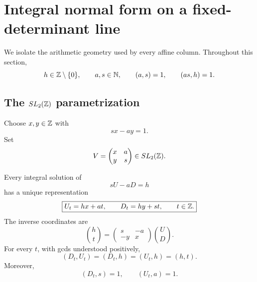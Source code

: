 \section{Integral normal form on a fixed-determinant line}
\label{sec:tpc33-affine-normal}

We isolate the arithmetic geometry used by every affine column.  Throughout
this section,
\begin{equation}
 h\in\mathbb Z\setminus\{0\},\qquad a,s\in\mathbb N,\qquad
 (a,s)=1,\qquad(as,h)=1.
 \label{eq:tpc33-affine-hypotheses}
\end{equation}

\subsection{The \texorpdfstring{\(SL_2(\mathbb Z)\)}{SL2(Z)} parametrization}

Choose \(x,y\in\mathbb Z\) with
\begin{equation}
 sx-ay=1.
 \label{eq:tpc33-bezout}
\end{equation}
Set
\begin{equation}
 V=\begin{pmatrix}x&a\\y&s\end{pmatrix}\in SL_2(\mathbb Z).
 \label{eq:tpc33-unimodular-matrix}
\end{equation}

\begin{theorem}
\label{thm:tpc33-affine-normal-form}
Every integral solution of
\begin{equation}
 sU-aD=h
 \label{eq:tpc33-fixed-determinant-equation}
\end{equation}
has a unique representation
\begin{equation}
 \boxed{
 U_t=hx+at,
 \qquad
 D_t=hy+st,
 \qquad t\in\mathbb Z.}
 \label{eq:tpc33-canonical-affine-forms}
\end{equation}
The inverse coordinates are
\begin{equation}
 \boxed{
 \binom ht
 =\begin{pmatrix}s&-a\\-y&x\end{pmatrix}
  \binom UD.}
 \label{eq:tpc33-affine-inverse}
\end{equation}
For every \(t\), with gcds understood positively,
\begin{equation}
 \boxed{
 (D_t,U_t)=(D_t,h)=(U_t,h)=(h,t).}
 \label{eq:tpc33-gcd-identities}
\end{equation}
Moreover,
\begin{equation}
 (D_t,s)=1,
 \qquad
 (U_t,a)=1.
 \label{eq:tpc33-slope-coprimality}
\end{equation}
\end{theorem}

